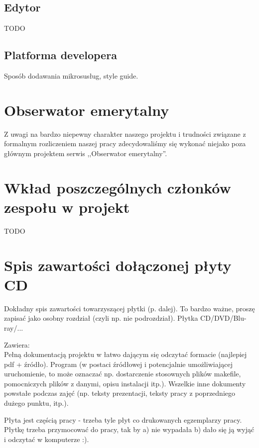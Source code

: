 \documentclass[licencjacka]{pracamgr}
\begin{document}
\section{Edytor}
TODO
\section{Platforma developera}
Sposób dodawania mikrosusług, style guide.

\chapter{Obserwator emerytalny}
Z uwagi na bardzo niepewny charakter naszego projektu i trudności związane z
formalnym rozliczeniem naszej pracy zdecydowaliśmy się wykonać niejako poza
głównym projektem serwis ,,Obserwator emerytalny''.

\chapter{Wkład poszczególnych członków zespołu w projekt}\label{r:wklad}
TODO
\appendix
\chapter{Spis zawartości dołączonej płyty CD}\label{r:spis}
Dokładny spis zawartości towarzyszącej płytki (p. dalej). To bardzo ważne, proszę zapisać jako osobny rozdział (czyli np. nie podrozdział). Płytka CD/DVD/Blu-ray/...

Zawiera:\\
Pełną dokumentacją projektu w łatwo dającym się odczytać formacie (najlepiej pdf + źródło).
Program (w postaci źródłowej i potencjalnie umożliwiającej uruchomienie, to może oznaczać np. dostarczenie stosownych plików makefile, pomocniczych plików z danymi, opisu instalacji itp.).
Wszelkie inne dokumenty powstałe podczas zajęć (np. teksty prezentacji, teksty pracy z poprzedniego dużego punktu, itp.).

Płyta jest częścią pracy - trzeba tyle płyt co drukowanych egzemplarzy pracy. Płytkę trzeba przymocować do pracy, tak by a) nie wypadała b) dało się ją wyjąć i odczytać w komputerze :).
\end{document}
